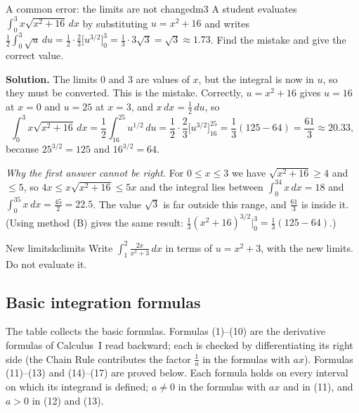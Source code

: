 \documentclass[11pt]{article}
\begin{document}
\begin{exmp}{A common error: the limits are not changed}{m3}
A student evaluates $\int_0^3x\sqrt{x^2+16}\,dx$ by substituting $u=x^2+16$ and writes $\frac12\int_0^3\sqrt u\,du=\frac12\cdot\frac23\big[u^{3/2}\big]_0^3=\frac13\cdot3\sqrt3=\sqrt3\approx1.73$. Find the mistake and give the correct value.

\textbf{Solution.} The limits $0$ and $3$ are values of $x$, but the integral is now in $u$, so they must be converted. This is the mistake. Correctly, $u=x^2+16$ gives $u=16$ at $x=0$ and $u=25$ at $x=3$, and $x\,dx=\frac12\,du$, so
\[\int_0^3x\sqrt{x^2+16}\,dx=\frac12\int_{16}^{25}u^{1/2}\,du=\frac12\cdot\frac23\Big[u^{3/2}\Big]_{16}^{25}=\frac13\left(125-64\right)=\frac{61}{3}\approx20.33 ,\]
because $25^{3/2}=125$ and $16^{3/2}=64$.

\emph{Why the first answer cannot be right.} For $0\le x\le3$ we have $\sqrt{x^2+16}\ge4$ and $\le5$, so $4x\le x\sqrt{x^2+16}\le5x$ and the integral lies between $\int_0^34x\,dx=18$ and $\int_0^35x\,dx=\frac{45}2=22.5$. The value $\sqrt3$ is far outside this range, and $\frac{61}3$ is inside it. (Using method (B) gives the same result: $\frac13(x^2+16)^{3/2}\big|_0^3=\frac13(125-64)$.)
\end{exmp}

\begin{kc}{New limits}{kclimits}
Write $\int_1^2\frac{2x}{x^2+3}\,dx$ in terms of $u=x^2+3$, with the new limits. Do not evaluate it.
\end{kc}

\subsection*{Basic integration formulas}

The table collects the basic formulas. Formulas (1)--(10) are the derivative formulas of Calculus~I read backward; each is checked by differentiating its right side (the Chain Rule contributes the factor $\frac1a$ in the formulas with $ax$). Formulas (11)--(13) and (14)--(17) are proved below. Each formula holds on every interval on which its integrand is defined; $a\ne0$ in the formulas with $ax$ and in (11), and $a>0$ in (12) and (13).
\end{document}
